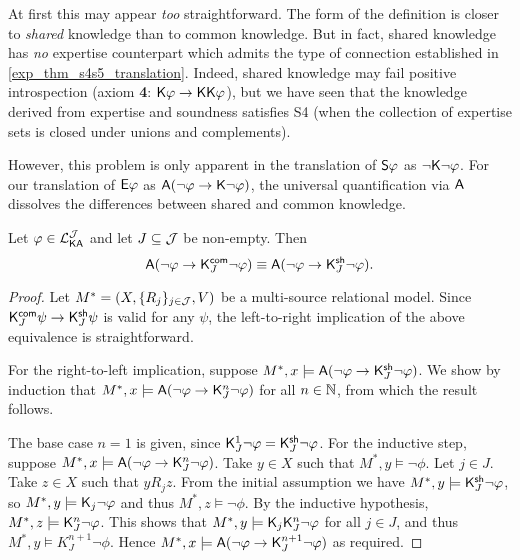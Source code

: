 At first this may appear \emph{too} straightforward. The form of the definition
is closer to \emph{shared} knowledge than to common knowledge. But in fact,
shared knowledge has \emph{no} expertise counterpart which admits the type of
connection established in \cref{exp_thm_s4s5_translation}. Indeed, shared knowledge
may fail positive introspection (axiom \textbf{4}: $\K\phi \limplies
\K\K\phi$), but we have seen that the knowledge derived from expertise and
soundness satisfies S4 (when the collection of expertise sets is closed under
unions and complements).

However, this problem is only apparent in the translation of $\S\phi$ as
$\neg\K\neg\phi$. For our translation of $\E\phi$ as $\A(\neg\phi \limplies
\K\neg\phi)$, the universal quantification via $\A$ dissolves the differences
between shared and common knowledge.

\begin{proposition}
\label{exp_prop_shared_common_collapse}
Let $\phi \in \cLKAJ$ and let $J \subseteq \J$ be non-empty.
Then
\[
\A(\neg\phi \limplies \Kcommon_J\neg\phi)
\equiv
\A(\neg\phi \limplies \Kshared_J\neg\phi).\]
\end{proposition}

\begin{proof}

Let $M^* = (X, \{R_j\}_{j \in \J}, V)$ be a multi-source relational
model. Since $\Kcommon_J\psi \limplies \Kshared_J\psi$ is valid for
any $\psi$, the left-to-right implication of the above equivalence
is straightforward.

For the right-to-left implication, suppose $M^*, x \models
\A(\neg\phi \limplies \Kshared_J\neg\phi)$. We show by induction that
$M^*, x \models \A(\neg\phi \limplies \K_J^n\neg\phi)$ for all
$n \in \N$, from which the result follows.

The base case $n = 1$ is given, since $\K_J^1\neg\phi =
\Kshared_J\neg\phi$. For the inductive step, suppose $M^*, x
\models \A(\neg\phi \limplies \K_J^n\neg\phi)$. Take $y \in X$ such
that $M^*, y \models \neg\phi$. Let $j \in J$. Take $z
\in X$ such that $y{R_j}z$. From the initial assumption we have
$M^*, y \models \Kshared_J\neg\phi$, so $M^*, y \models
\K_j\neg\phi$ and thus $M^*, z \models \neg\phi$. By the inductive
hypothesis, $M^*, z \models \K_J^n\neg\phi$. This shows that
$M^*, y \models \K_j\K_J^n\neg\phi$ for all $j \in J$, and
thus $M^*, y \models K^{n+1}_J\neg\phi$. Hence $M^*, x
\models \A(\neg\phi \limplies \K^{n+1}_J\neg\phi)$ as required.
\end{proof}

